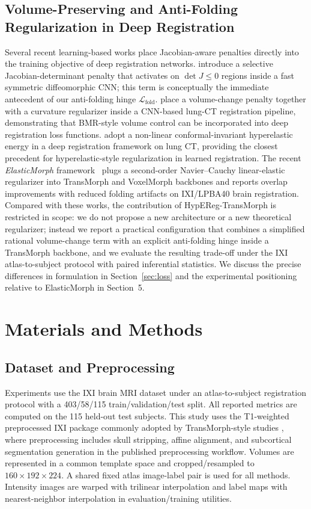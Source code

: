 \documentclass[11pt,a4paper]{article}
\begin{document}
\subsection{Volume-Preserving and Anti-Folding Regularization in Deep Registration}
Several recent learning-based works place Jacobian-aware penalties directly into the training objective of deep registration networks. \citet{mok2020fast} introduce a selective Jacobian-determinant penalty that activates on $\det J\le 0$ regions inside a fast symmetric diffeomorphic CNN; this term is conceptually the immediate antecedent of our anti-folding hinge $\mathcal{L}_{\mathrm{fold}}$. \citet{hering2021lung} place a volume-change penalty together with a curvature regularizer inside a CNN-based lung-CT registration pipeline, demonstrating that BMR-style volume control can be incorporated into deep registration loss functions. \citet{zou2023conformal} adopt a non-linear conformal-invariant hyperelastic energy in a deep registration framework on lung CT, providing the closest precedent for hyperelastic-style regularization in learned registration. The recent \emph{ElasticMorph} framework~\citep{elasticmorph2025} plugs a second-order Navier--Cauchy linear-elastic regularizer into TransMorph and VoxelMorph backbones and reports overlap improvements with reduced folding artifacts on IXI/LPBA40 brain registration. Compared with these works, the contribution of HypEReg-TransMorph is restricted in scope: we do not propose a new architecture or a new theoretical regularizer; instead we report a practical configuration that combines a simplified rational volume-change term with an explicit anti-folding hinge inside a TransMorph backbone, and we evaluate the resulting trade-off under the IXI atlas-to-subject protocol with paired inferential statistics. We discuss the precise differences in formulation in Section~\ref{sec:loss} and the experimental positioning relative to ElasticMorph in Section~5.

\section{Materials and Methods}

\subsection{Dataset and Preprocessing}
Experiments use the IXI brain MRI dataset \citep{ixidataset} under an atlas-to-subject registration protocol with a 403/58/115 train/validation/test split. All reported metrics are computed on the 115 held-out test subjects. This study uses the T1-weighted preprocessed IXI package commonly adopted by TransMorph-style studies \citep{chen2022transmorph,kim2021cyclemorph}, where preprocessing includes skull stripping, affine alignment, and subcortical segmentation generation in the published preprocessing workflow. Volumes are represented in a common template space and cropped/resampled to \(160 \times 192 \times 224\). A shared fixed atlas image-label pair is used for all methods. Intensity images are warped with trilinear interpolation and label maps with nearest-neighbor interpolation in evaluation/training utilities.
\end{document}
